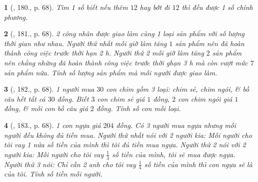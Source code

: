 \documentclass{article}
\newtheorem{baitoan}{}
\begin{document}
\begin{baitoan}[\cite{Tuyen_Toan_9_old}, 180., p. 68]
	Tìm 1 số biết nếu thêm $12$ hay bớt đi $12$ thì đều được 1 số chính phương.
\end{baitoan}

\begin{baitoan}[\cite{Tuyen_Toan_9_old}, 181., p. 68]
	2 công nhân được giao làm cùng 1 loại sản phẩm với số lượng thời gian như nhau. Người thứ nhất mỗi giờ làm tăng $1$ sản phẩm nên đã hoàn thành công việc trước thời hạn {\rm2 h}. Người thứ 2 mỗi giờ làm tăng $2$ sản phẩm nên chẳng những đã hoàn thành công việc trước thời ghạn {\rm3 h} mà còn vượt mức $7$ sản phẩm nữa. Tính số lượng sản phẩm mà mỗi người được giao làm.
\end{baitoan}

\begin{baitoan}[\cite{Tuyen_Toan_9_old}, 182., p. 68]
	1 người mua $30$ con chim gồm 3 loại: chim sẻ, chim ngói, \& bồ câu hết tất cả $30$ đồng. Biết $3$ con chim sẻ giá $1$ đồng, $2$ con chim ngói giá $1$ đồng, \& mỗi con bồ câu giá $2$ đồng. Tính số con mỗi loại.
\end{baitoan}

\begin{baitoan}[\cite{Tuyen_Toan_9_old}, 183., p. 68]
	1 con ngựa giá $204$ đồng. Có 3 người mua ngựa nhưng mỗi người đều không đủ tiền mua. Người thứ nhất nói với 2 người kia: Mỗi người cho tôi vay 1 nửa số tiền của mình thì tôi đủ tiền mua ngựa. Người thứ 2 nói với 2 người kia: Mỗi người cho tôi vay $\frac{1}{3}$ số tiền của mình, tôi sẽ mua được ngựa. Người thứ 3 nói: Chỉ cần 2 anh cho tôi vay $\frac{1}{4}$ số tiền của mình thì con ngựa sẽ là của tôi. Tính số tiền mỗi người.
\end{baitoan}


\printbibliography[heading=bibintoc]
	
\end{document}
